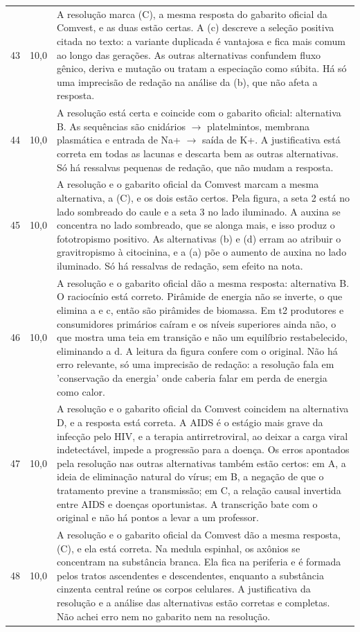 \documentclass{article}%
\begin{document}
\begin{longtable}{@{}c c p{}@{}}
43 & 10,0 & A resolução marca (C), a mesma resposta do gabarito oficial da Comvest, e as duas estão certas. A (c) descreve a seleção positiva citada no texto: a variante duplicada é vantajosa e fica mais comum ao longo das gerações. As outras alternativas confundem fluxo gênico, deriva e mutação ou tratam a especiação como súbita. Há só uma imprecisão de redação na análise da (b), que não afeta a resposta. \\
44 & 10,0 & A resolução está certa e coincide com o gabarito oficial: alternativa B. As sequências são cnidários $\to$ platelmintos, membrana plasmática e entrada de Na+ $\to$ saída de K+. A justificativa está correta em todas as lacunas e descarta bem as outras alternativas. Só há ressalvas pequenas de redação, que não mudam a resposta. \\
45 & 10,0 & A resolução e o gabarito oficial da Comvest marcam a mesma alternativa, a (C), e os dois estão certos. Pela figura, a seta 2 está no lado sombreado do caule e a seta 3 no lado iluminado. A auxina se concentra no lado sombreado, que se alonga mais, e isso produz o fototropismo positivo. As alternativas (b) e (d) erram ao atribuir o gravitropismo à citocinina, e a (a) põe o aumento de auxina no lado iluminado. Só há ressalvas de redação, sem efeito na nota. \\
46 & 10,0 & A resolução e o gabarito oficial dão a mesma resposta: alternativa B. O raciocínio está correto. Pirâmide de energia não se inverte, o que elimina a e c, então são pirâmides de biomassa. Em t2 produtores e consumidores primários caíram e os níveis superiores ainda não, o que mostra uma teia em transição e não um equilíbrio restabelecido, eliminando a d. A leitura da figura confere com o original. Não há erro relevante, só uma imprecisão de redação: a resolução fala em 'conservação da energia' onde caberia falar em perda de energia como calor. \\
47 & 10,0 & A resolução e o gabarito oficial da Comvest coincidem na alternativa D, e a resposta está correta. A AIDS é o estágio mais grave da infecção pelo HIV, e a terapia antirretroviral, ao deixar a carga viral indetectável, impede a progressão para a doença. Os erros apontados pela resolução nas outras alternativas também estão certos: em A, a ideia de eliminação natural do vírus; em B, a negação de que o tratamento previne a transmissão; em C, a relação causal invertida entre AIDS e doenças oportunistas. A transcrição bate com o original e não há pontos a levar a um professor. \\
48 & 10,0 & A resolução e o gabarito oficial da Comvest dão a mesma resposta, (C), e ela está correta. Na medula espinhal, os axônios se concentram na substância branca. Ela fica na periferia e é formada pelos tratos ascendentes e descendentes, enquanto a substância cinzenta central reúne os corpos celulares. A justificativa da resolução e a análise das alternativas estão corretas e completas. Não achei erro nem no gabarito nem na resolução. \\

\end{longtable}
\end{document}
